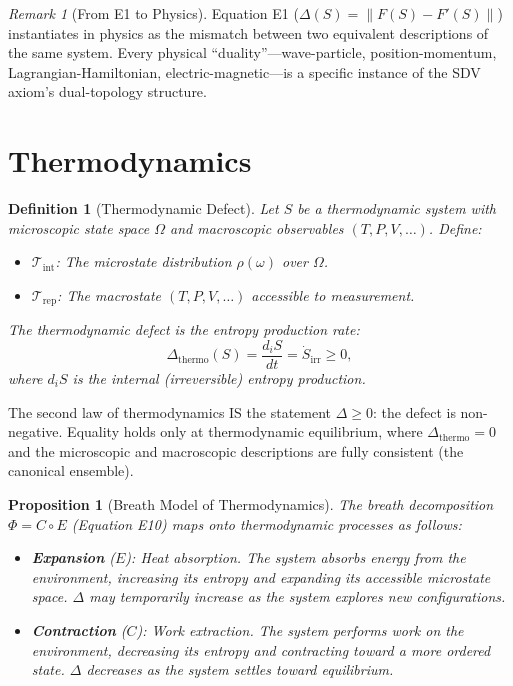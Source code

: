 \documentclass[12pt, openany]{book}
\newtheorem{proposition}[theorem]{Proposition}
\newtheorem{definition}[theorem]{Definition}
\theoremstyle{remark}
\newtheorem{remark}[theorem]{Remark}
\newcommand{\Tint}{\mathcal{T}_{\mathrm{int}}}
\newcommand{\Trep}{\mathcal{T}_{\mathrm{rep}}}
\begin{document}
\begin{remark}[From E1 to Physics]
Equation E1 ($\Delta(S) = \|F(S) - F'(S)\|$) instantiates in physics as the mismatch
between two equivalent descriptions of the same system.  Every physical ``duality''---wave-particle,
position-momentum, Lagrangian-Hamiltonian, electric-magnetic---is a specific instance of
the SDV axiom's dual-topology structure.
\end{remark}


\section{Thermodynamics}
\label{sec:thermo}

\begin{definition}[Thermodynamic Defect]
\label{def:thermo-defect}
Let $S$ be a thermodynamic system with microscopic state space $\Omega$ and macroscopic
observables $(T, P, V, \ldots)$.  Define:
\begin{itemize}
  \item $\Tint$: The microstate distribution $\rho(\omega)$ over $\Omega$.
  \item $\Trep$: The macrostate $(T, P, V, \ldots)$ accessible to measurement.
\end{itemize}
The thermodynamic defect is the entropy production rate:
\[
  \Delta_{\mathrm{thermo}}(S) = \frac{d_i S}{dt} = \dot{S}_{\mathrm{irr}} \geq 0,
\]
where $d_i S$ is the internal (irreversible) entropy production.
\end{definition}

The second law of thermodynamics IS the statement $\Delta \geq 0$: the defect is
non-negative.  Equality holds only at thermodynamic equilibrium, where
$\Delta_{\mathrm{thermo}} = 0$ and the microscopic and macroscopic descriptions
are fully consistent (the canonical ensemble).

\begin{proposition}[Breath Model of Thermodynamics]
\label{prop:thermo-breath}
The breath decomposition $\Phi = C \circ E$ (Equation E10) maps onto thermodynamic
processes as follows:
\begin{itemize}
  \item \textbf{Expansion} ($E$): Heat absorption.  The system absorbs energy from the
        environment, increasing its entropy and expanding its accessible microstate space.
        $\Delta$ may temporarily increase as the system explores new configurations.
  \item \textbf{Contraction} ($C$): Work extraction.  The system performs work on the
        environment, decreasing its entropy and contracting toward a more ordered state.
        $\Delta$ decreases as the system settles toward equilibrium.
\end{itemize}
\end{proposition}
\end{document}

